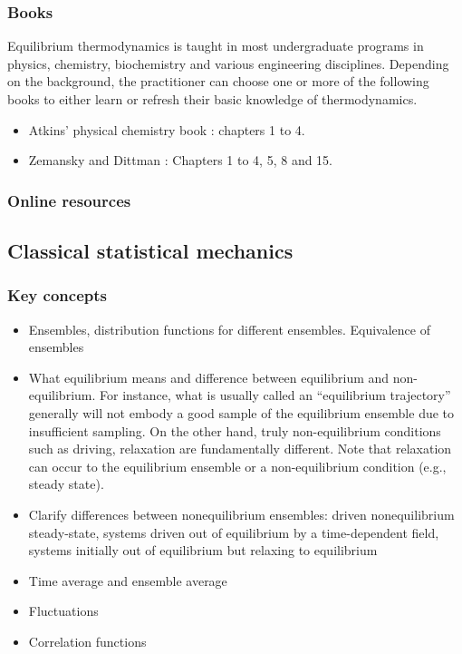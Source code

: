 \documentclass[9pt,bestpractices]{livecoms}
\begin{document}
\subsubsection{Books}
Equilibrium thermodynamics is taught in most undergraduate programs in physics, chemistry, biochemistry and various engineering disciplines. Depending on the background, the practitioner can choose one or more of the following books to either learn or refresh their basic knowledge of thermodynamics. 
\begin{itemize}
\item Atkins' physical chemistry book \cite{AtkinsBook} : chapters 1 to 4.
\item Zemansky and Dittman \cite{ZemanskyBook}: Chapters 1 to 4, 5, 8 and 15.
\end{itemize}
\subsubsection{Online resources}

\subsection{Classical statistical mechanics}
\subsubsection{Key concepts}
\begin{itemize}
\item Ensembles, distribution functions for different ensembles. Equivalence of ensembles
\item What equilibrium means and difference between equilibrium and
    non-equilibrium. For instance, what is usually called an ``equilibrium
        trajectory'' generally will not embody a good sample of the equilibrium
        ensemble due to insufficient sampling.  On the other hand, truly
        non-equilibrium conditions such as driving, relaxation are fundamentally
        different.  Note that relaxation can occur to the equilibrium ensemble
        or a non-equilibrium condition (e.g., steady state).
\item Clarify differences between nonequilibrium ensembles: driven
    nonequilibrium steady-state, systems driven out of equilibrium by a
        time-dependent field, systems initially out of equilibrium but relaxing
        to equilibrium
\item Time average and ensemble average
\item Fluctuations
\item Correlation functions
\end{itemize}
\end{document}
